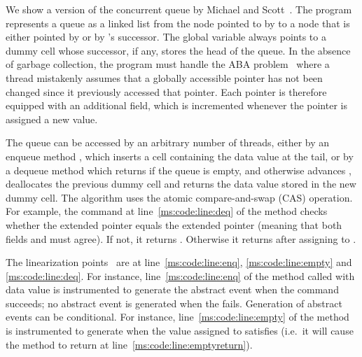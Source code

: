 \label{MS:lock:free:queue}
%
We show a version of the concurrent queue by Michael and
Scott~\cite{MS:QueueAlgorithms}.
%
The program represents a queue as a linked list from the node pointed
to by  to a node that is either pointed by
 or by 's successor.
%
The global variable  always points to a dummy cell whose
successor, if any, stores the head of the queue.
%
In the absence of garbage collection, the program must handle the ABA
problem~\cite{ABA:1983,ABA:Wikipedia} where a thread mistakenly
assumes that a globally accessible pointer has not been changed since
it previously accessed that pointer.
%
Each pointer is therefore equipped with an additional 
field, which is incremented whenever the pointer is assigned a new
value.

The queue can be accessed by an arbitrary number of threads, either by
an enqueue method , which inserts a cell containing
the data value  at the tail, or by a dequeue method
 which returns  if the queue is empty,
and otherwise advances , deallocates the previous dummy
cell and returns the data value stored in the new dummy cell.
%
The algorithm uses the atomic compare-and-swap (CAS) operation.
%
For example, the command %
 at
line~\ref{ms:code:line:deq} of the  method checks whether
the extended pointer  equals the extended pointer
 (meaning that both fields  and
 must agree).
%
If not, it returns . Otherwise it returns
 after assigning %
 to .

The linearization points~\commitpoint{} %
are at line~\ref{ms:code:line:enq}, \ref{ms:code:line:empty} and \ref{ms:code:line:deq}.
%
For instance, line~\ref{ms:code:line:enq} of the  method
called with data value  is instrumented to generate the
abstract event  when the  command
succeeds;
%
no abstract event is generated when the  fails.
%
Generation of abstract events can be conditional.
%
For instance, line~\ref{ms:code:line:empty} of the 
method is instrumented to generate  when the
value assigned to  satisfies 
(i.e.\ it will cause the method to return  at
line~\ref{ms:code:line:emptyreturn}).


